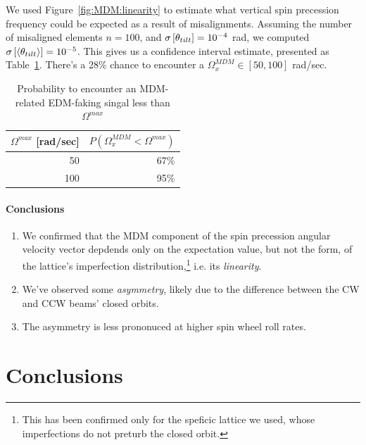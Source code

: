 \documentclass[]{elsarticle}
\newcommand{\W}{\Omega}
\newcommand{\SD}[1]{\sigma\bkt*{#1}}
\newcommand{\avg}[1]{\langle{#1}\rangle}
\begin{document}
We used Figure~\ref{fig:MDM:linearity} to estimate what vertical spin precession frequency could be expected
as a result of misalignments. Assuming the number of misaligned elements $n=100$, and
$\SD{\theta_{tilt}} = 10^{-4}$ rad, we computed $\SD{\avg{\theta_{tilt}}} = 10^{-5}$. This gives us a confidence
interval estimate, presented as Table~\ref{tbl:MDM_CI}. There's a 28\% chance to encounter a
$\W_x^{MDM}\in[50, 100]$ rad/sec.

\begin{table}[h]\centering
  \caption{Probability to encounter an MDM-related EDM-faking singal less than $\W^{max}$\label{tbl:MDM_CI}}
  \begin{tabular}{rr}
    \hline
    $\W^{max}$ [rad/sec] & $P(\W_x^{MDM} < \W^{max})$ \\
    \hline
    50 & 67\% \\
    100 & 95\% \\
    \hline
  \end{tabular}
\end{table}

\paragraph{Conclusions}
\begin{enumerate}[(1)]
\item We confirmed that the MDM component of the spin precession angular velocity vector depdends only on the
  expectation value, but not the form, of the lattice's imperfection distribution,\footnote{This has been
    confirmed only for the speficic lattice we used, whose imperfections do not preturb the closed orbit.}
  i.e. its \emph{linearity}.
\item We've observed some \emph{asymmetry}, likely due to the difference between the
  CW and CCW beams' closed orbits.
\item The asymmetry is less prononuced at higher spin wheel roll rates.
\end{enumerate}

\section{Conclusions}
\end{document}
